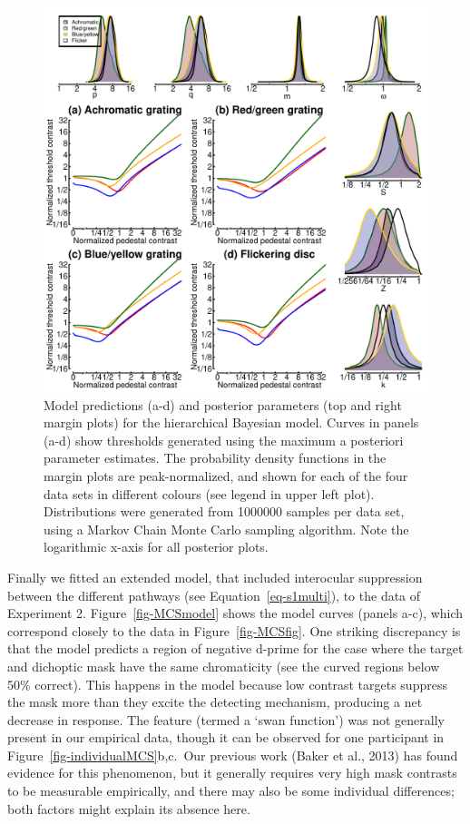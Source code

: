 \documentclass[
  letterpaper,
  DIV=11,
  numbers=noendperiod]{scrartcl}
\begin{document}
\begin{figure}

{\centering \includegraphics{Figures/stanoutput.pdf}

}

\caption{\label{fig-bayesianmodel}Model predictions (a-d) and posterior
parameters (top and right margin plots) for the hierarchical Bayesian
model. Curves in panels (a-d) show thresholds generated using the
maximum a posteriori parameter estimates. The probability density
functions in the margin plots are peak-normalized, and shown for each of
the four data sets in different colours (see legend in upper left plot).
Distributions were generated from 1000000 samples per data set, using a
Markov Chain Monte Carlo sampling algorithm. Note the logarithmic x-axis
for all posterior plots.}

\end{figure}

Finally we fitted an extended model, that included interocular
suppression between the different pathways (see
Equation~\ref{eq-s1multi}), to the data of Experiment 2.
Figure~\ref{fig-MCSmodel} shows the model curves (panels a-c), which
correspond closely to the data in Figure~\ref{fig-MCSfig}. One striking
discrepancy is that the model predicts a region of negative d-prime for
the case where the target and dichoptic mask have the same chromaticity
(see the curved regions below 50\% correct). This happens in the model
because low contrast targets suppress the mask more than they excite the
detecting mechanism, producing a net decrease in response. The feature
(termed a `swan function') was not generally present in our empirical
data, though it can be observed for one participant in
Figure~\ref{fig-individualMCS}b,c.~Our previous work (Baker et al.,
2013) has found evidence for this phenomenon, but it generally requires
very high mask contrasts to be measurable empirically, and there may
also be some individual differences; both factors might explain its
absence here.
\end{document}
